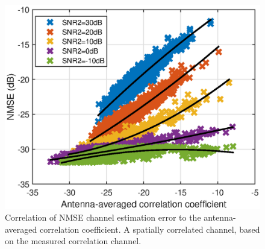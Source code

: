 \begin{figure}[t!]
	\centering
	\includegraphics[width=1.0\linewidth]{figures/NMSE_correlation_allcases_collocated_wPA.eps}
	\caption{Correlation of NMSE channel estimation error to the antenna-averaged correlation coefficient. A spatially correlated channel, based on
the measured correlation channel.}
	\label{fig:channel_correlation_measured}
\end{figure}
